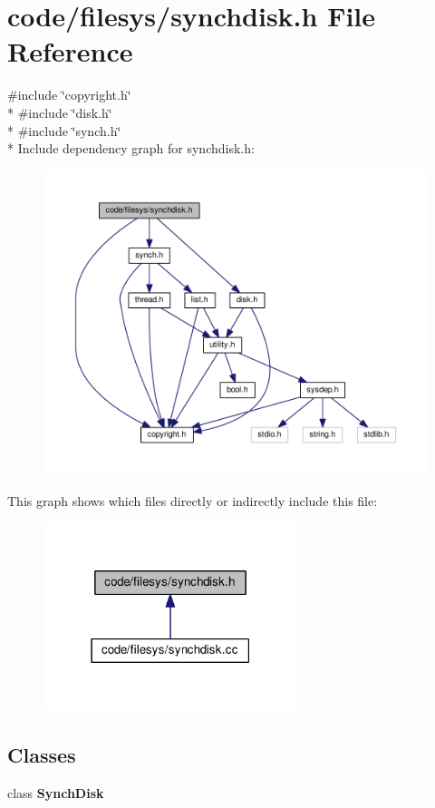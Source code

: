 \section{code/filesys/synchdisk.h File Reference}
\label{synchdisk_8h}
{\ttfamily \#include \char`\"{}copyright.\+h\char`\"{}}\\*
{\ttfamily \#include \char`\"{}disk.\+h\char`\"{}}\\*
{\ttfamily \#include \char`\"{}synch.\+h\char`\"{}}\\*
Include dependency graph for synchdisk.\+h\+:
\nopagebreak
\begin{figure}[H]
\begin{center}
\leavevmode
\includegraphics[width=350pt]{synchdisk_8h__incl}
\end{center}
\end{figure}
This graph shows which files directly or indirectly include this file\+:
\nopagebreak
\begin{figure}[H]
\begin{center}
\leavevmode
\includegraphics[width=210pt]{synchdisk_8h__dep__incl}
\end{center}
\end{figure}
\subsection*{Classes}
\begin{DoxyCompactItemize}
\item 
class {\bf Synch\+Disk}
\end{DoxyCompactItemize}
